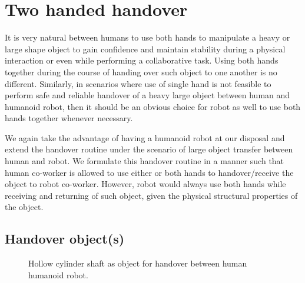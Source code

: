 

\clearpage

\section{Two handed handover}\label{both hands together}

It is very natural between humans to use both hands to manipulate a heavy or large shape object to gain confidence and maintain stability during a physical interaction or even while performing a collaborative task. Using both hands together during the course of handing over such object to one another is no different. Similarly, in scenarios where use of single hand is not feasible to perform safe and reliable handover of a heavy large object between human and humanoid robot, then it should be an obvious choice for robot as well to use both hands together whenever necessary. 


We again take the advantage of having a humanoid robot at our disposal and extend the handover routine under the scenario of large object transfer between human and robot. We formulate this handover routine in a manner such that human co-worker is allowed to use either or both hands to handover/receive the object to robot co-worker. However, robot would always use both hands while receiving and returning of such object, given the physical structural properties of the object.

\subsection{Handover object(s)}


\begin{figure}[hpt]
	\caption{Hollow cylinder shaft as object for handover between human humanoid robot.}
	\label{fig:pipe_ex}
\end{figure}


